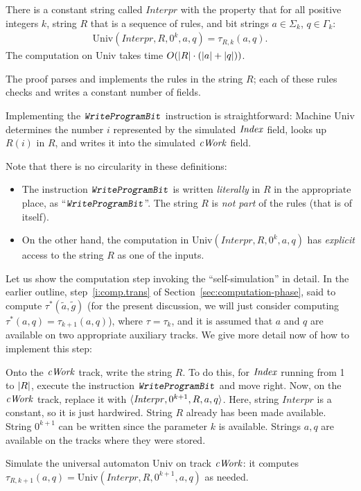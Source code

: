 \documentclass[12pt]{memoir}
\newcommand{\fld}[1]{\ensuremath{\textit{#1\/}}}
\newcommand{\rul}[1]{\ensuremath{\texttt{\slshape #1\/}}}
\newcommand{\Index}{\fld{Index}}
\newcommand{\cWork}{\fld{cWork}}
\newcommand{\Interpr}{\mathit{Interpr}}
\newcommand{\Un}{\mathrm{Univ}}
\newcommand{\WriteProgramBit}{\rul{WriteProgramBit}}
\begin{document}
\begin{theorem}
There is a constant string called \( \Interpr \) with the property that for
all positive integers \( k \), string \( R \) that is a
sequence of rules, and bit strings \( a\in\Sigma_{k} \), \( q\in \Gamma_{k} \):
 \begin{align*}
  \Un(\Interpr,R,0^{k},a,q)=\tau_{R,k}(a,q).
 \end{align*}
The computation on \( \Un \) takes time \( O(\lvert R \rvert\cdot (\lvert a \rvert+\lvert q \rvert)) \).
\end{theorem}

The proof parses and implements the rules in the string \( R \); each of these rules
checks and writes a constant number of fields.

Implementing the \( \WriteProgramBit \) instruction is straightforward:
Machine \( \Un \) determines the number \( i \)
represented by the simulated \( \Index \) field, 
looks up \( R(i) \) in \( R \), and writes it into the simulated \( \cWork \) field.

Note that there is no circularity in these definitions:
  \begin{itemize}
  \item 
The instruction \( \WriteProgramBit \) is written \emph{literally}
in \( R \) in the appropriate place, as ``\(\WriteProgramBit \)''.
The string \( R \) is \emph{not part} of the rules (that is of itself).  
  \item On the other hand, the computation in
\( \Un(\Interpr,R,0^{k},a, q) \) 
has \emph{explicit} access to the string \( R \) as one of the inputs.
  \end{itemize}

Let us show the computation step invoking the ``self-simulation'' in detail.
In the earlier outline, step~\ref{i:comp.trans} of Section~\ref{sec:computation-phase},
said to compute \( \tau^{*}(\tilde a, \tilde g) \)
(for the present discussion, we will just consider computing 
\( \tau^{*}(a,q)=\tau_{k+1}(a,q) \)), where \( \tau=\tau_{k} \),
and it is assumed that \( a \) and \( q \) are available on two appropriate
auxiliary tracks.
We give more detail now of how to implement this step:

\begin{enumerate}
\item Onto the \( \cWork \) track, write the string \( R \).
To do this, for \( \Index \) running from 1 to \( \lvert R \rvert \), 
execute the instruction \( \WriteProgramBit \) and move right.
Now, on the \( \cWork  \) track, replace it with \( \ang{\Interpr,0^{k+1},R,a,q} \).
Here, string \( \Interpr \) is a constant, so it is just hardwired.
String \( R \) already has been made available.
String \( 0^{k+1} \) can be written since the parameter \( k \) is available.
Strings \( a,q \) are available on the tracks where they were stored.
\begin{sloppypar}
 \item Simulate the universal automaton \( \Un \) on track \( \cWork \):
   it computes \( \tau_{R,k+1}(a,q)=\Un(\Interpr,R,0^{k+1}, a,q) \)
as needed.  
\end{sloppypar}
\end{enumerate}
\end{document}
